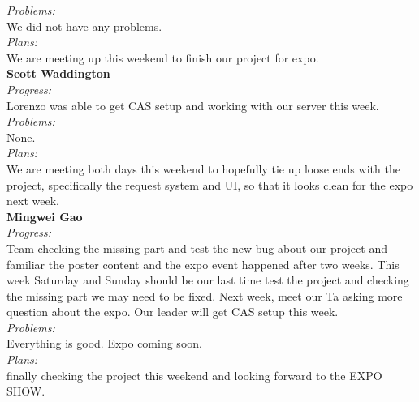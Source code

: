\noindent\textit{Problems:}\\
\noindent We did not have any problems.\\

\noindent\textit{Plans:}\\
\noindent We are meeting up this weekend to finish our project for expo.\\

\noindent\textbf{Scott Waddington}\\
\noindent\textit{Progress:}\\
Lorenzo was able to get CAS setup and working with our server this week.\\

\noindent\textit{Problems:}\\
\noindent None.\\

\noindent\textit{Plans:}\\
\noindent We are meeting both days this weekend to hopefully tie up loose ends with the project, specifically the request system and UI, so that it looks clean for the expo next week.\\

\noindent\textbf{Mingwei Gao}\\
\noindent\textit{Progress:}\\
 Team checking the missing part and test the new bug about our project and familiar the poster content and the expo event happened after two weeks. This week Saturday and Sunday should be our last time test the project and checking the missing part we may need to be fixed. Next week, meet our Ta asking more question about the expo. Our leader will get CAS setup this week.\\

\noindent\textit{Problems:}\\
\noindent Everything is good. Expo coming soon.\\

\noindent\textit{Plans:}\\
\noindent finally checking the project this weekend and looking forward to the EXPO SHOW.\\